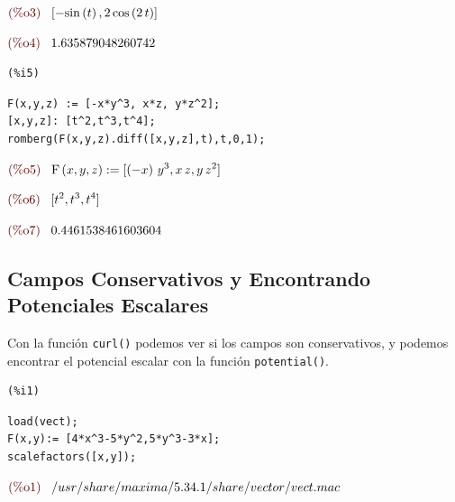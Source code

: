 \documentclass[12pt]{article}
\begin{document}
\begin{math}\displaystyle
\parbox{8ex}{\color{labelcolor}(\%o3) }
[-\mathrm{sin}\left( t\right) ,2\,\mathrm{cos}\left( 2\,t\right) ]
\end{math}

\begin{math}\displaystyle
\parbox{8ex}{\color{labelcolor}(\%o4) }
1.635879048260742
\end{math}


\noindent
\begin{minipage}[t]{8ex}{\color{red}\bf
\begin{verbatim}
(%i5) 
\end{verbatim}}
\end{minipage}
\begin{minipage}[t]{\textwidth}{\color{blue}
\begin{verbatim}
F(x,y,z) := [-x*y^3, x*z, y*z^2];
[x,y,z]: [t^2,t^3,t^4];
romberg(F(x,y,z).diff([x,y,z],t),t,0,1);
\end{verbatim}}
\end{minipage}
\begin{math}\displaystyle
\parbox{8ex}{\color{labelcolor}(\%o5) }
\mathrm{F}\left( x,y,z\right) :=[\left( -x\right) \,{y}^{3},x\,z,y\,{z}^{2}]
\end{math}

\begin{math}\displaystyle
\parbox{8ex}{\color{labelcolor}(\%o6) }
[{t}^{2},{t}^{3},{t}^{4}]
\end{math}

\begin{math}\displaystyle
\parbox{8ex}{\color{labelcolor}(\%o7) }
0.4461538461603604
\end{math}

\subsection{Campos Conservativos y Encontrando Potenciales Escalares}
Con la función \texttt{curl()} podemos ver si los campos son conservativos, y  podemos encontrar el potencial escalar con la función \texttt{potential()}.
 
 \noindent
\begin{minipage}[t]{8ex}{\color{red}\bf
\begin{verbatim}
(%i1) 
\end{verbatim}}
\end{minipage}
\begin{minipage}[t]{\textwidth}{\color{blue}
\begin{verbatim}
load(vect);
F(x,y):= [4*x^3-5*y^2,5*y^3-3*x];
scalefactors([x,y]);
\end{verbatim}}
\end{minipage}
\begin{math}\displaystyle
\parbox{8ex}{\color{labelcolor}(\%o1) }
/usr/share/maxima/5.34.1/share/vector/vect.mac
\end{math}
\end{document}

